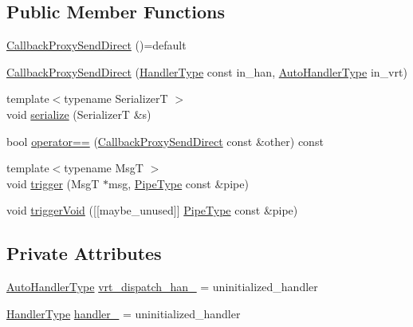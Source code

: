 \subsection*{Public Member Functions}
\begin{DoxyCompactItemize}
\item 
\hyperlink{structvt_1_1pipe_1_1callback_1_1_callback_proxy_send_direct_a9dd9c90d3e2b112d9df3c04626d6c272}{Callback\+Proxy\+Send\+Direct} ()=default
\item 
\hyperlink{structvt_1_1pipe_1_1callback_1_1_callback_proxy_send_direct_ae864e787c012e11651ddd185ec6b31bf}{Callback\+Proxy\+Send\+Direct} (\hyperlink{namespacevt_af64846b57dfcaf104da3ef6967917573}{Handler\+Type} const in\+\_\+han, \hyperlink{structvt_1_1pipe_1_1callback_1_1_callback_proxy_send_direct_adbd70e6c1d6b374083e5d0babdcab07e}{Auto\+Handler\+Type} in\+\_\+vrt)
\item 
{\footnotesize template$<$typename SerializerT $>$ }\\void \hyperlink{structvt_1_1pipe_1_1callback_1_1_callback_proxy_send_direct_a1a64835cb030af898ad2beaec56d7887}{serialize} (SerializerT \&s)
\item 
bool \hyperlink{structvt_1_1pipe_1_1callback_1_1_callback_proxy_send_direct_a8ccc6351627fe71b4ca82d2ce2a5a7c1}{operator==} (\hyperlink{structvt_1_1pipe_1_1callback_1_1_callback_proxy_send_direct}{Callback\+Proxy\+Send\+Direct} const \&other) const
\item 
{\footnotesize template$<$typename MsgT $>$ }\\void \hyperlink{structvt_1_1pipe_1_1callback_1_1_callback_proxy_send_direct_a17ec0811bb79213d0b99c7f7bcfa697d}{trigger} (MsgT $\ast$msg, \hyperlink{namespacevt_ac9852acda74d1896f48f406cd72c7bd3}{Pipe\+Type} const \&pipe)
\item 
void \hyperlink{structvt_1_1pipe_1_1callback_1_1_callback_proxy_send_direct_a5a78393b2c2670a667c5672259ce61d2}{trigger\+Void} (\mbox{[}\mbox{[}maybe\+\_\+unused\mbox{]}\mbox{]} \hyperlink{namespacevt_ac9852acda74d1896f48f406cd72c7bd3}{Pipe\+Type} const \&pipe)
\end{DoxyCompactItemize}
\subsection*{Private Attributes}
\begin{DoxyCompactItemize}
\item 
\hyperlink{structvt_1_1pipe_1_1callback_1_1_callback_proxy_send_direct_adbd70e6c1d6b374083e5d0babdcab07e}{Auto\+Handler\+Type} \hyperlink{structvt_1_1pipe_1_1callback_1_1_callback_proxy_send_direct_a665d0e3eddc6aecea9112457ae96dae4}{vrt\+\_\+dispatch\+\_\+han\+\_\+} = uninitialized\+\_\+handler
\item 
\hyperlink{namespacevt_af64846b57dfcaf104da3ef6967917573}{Handler\+Type} \hyperlink{structvt_1_1pipe_1_1callback_1_1_callback_proxy_send_direct_a812b76a919292c66abd4ad0326011129}{handler\+\_\+} = uninitialized\+\_\+handler
\end{DoxyCompactItemize}


